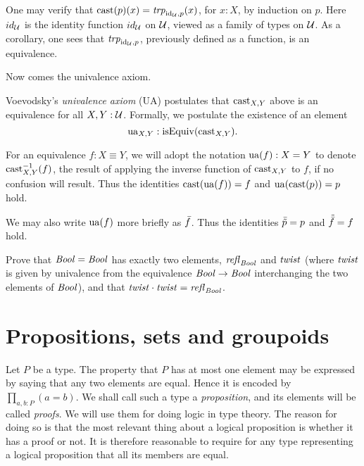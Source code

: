 One may verify that $\mathrm{cast}(p)(x) = \mathop{\mathit{trp}_{\mathord{\mathrm{id}}_{\mathcal{U}}, p}} (x)$, for $x : X$, by induction on $p$.
Here $id_{\mathcal{U}}$ is the identity function $id_{\mathcal{U}}$ on $\mathcal{U}$, viewed as a family of types on $\mathcal{U}$. 
As a corollary, one sees that $\mathop{\mathit{trp}_{\mathord{\mathrm{id}}_{\mathcal{U}}, p}}$, previously defined as a function, is an equivalence.

Now comes the univalence axiom.

\begin{definition}\label{def:univalence}
Voevodsky's \emph{univalence axiom} (UA) postulates that 
$\mathrm{cast}_{X,Y}$ above is an equivalence for all $X,Y:\mathcal{U}$.
Formally, we postulate the existence of an element \[ \mathrm{ua}_{X,Y} : \mathrm{isEquiv}(\mathrm{cast}_{X,Y}).\]
\end{definition}

For an equivalence $f: X\equiv Y$, we will adopt the notation $\mathrm{ua}(f) : X = Y $ to denote $\mathrm{cast}_{X,Y}^{-1}(f)$, the result of applying the
inverse function of $\mathrm{cast}_{X,Y}$ to $f$, if no confusion will result.  Thus the identities $\mathrm{cast} (\mathrm{ua} (f)) = f$ and $\mathrm{ua} (\mathrm{cast} (p)) = p$ hold.

We may also write $\mathrm{ua} (f)$ more briefly as $\bar {f}$.  Thus the identities $\bar {\tilde {p}} = p$ and $\tilde {\bar {f}} = f$ hold.

\begin{xca}\label{xca:C2}
Prove that $\mathop{\mathit{Bool}}=\mathop{\mathit{Bool}}$ has exactly two elements, 
$\mathop{{\it refl}_{\mathop{\mathit{Bool}}}}$ and $\mathit{twist}$ (where $\mathit{twist}$ is given by 
univalence from the equivalence $\mathop{\mathit{Bool}}\to\mathop{\mathit{Bool}}$ interchanging 
the two elements of $\mathop{\mathit{Bool}}$), and that $\mathit{twist}\cdot\mathit{twist}=\mathop{{\it refl}_{\mathop{\mathit{Bool}}}}$.
\end{xca}


\section{Propositions, sets and groupoids}
\label{sec:props-sets-grpds}

Let $P$ be a type.  The property that $P$ has at most one element may 
be expressed by saying that any two elements are equal. 
Hence it is encoded by $\prod_{a,b:P} (a=b)$.  
We shall call such a type a \emph{proposition}, 
and its elements will be called \emph{proofs}.
We will use them for doing logic in type theory.
The reason for doing so is that the most relevant
thing about a logical proposition is whether it has a proof or not.
It is therefore reasonable to require for any type representing 
a logical proposition that all its members are equal.

